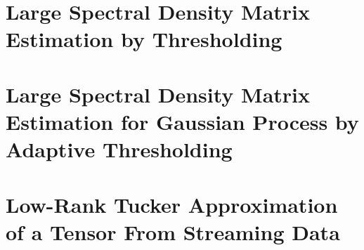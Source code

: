 \documentclass[phd,tocprelim]{cornell}
\numberwithin{equation}{section}
\begin{document}
\chapter{Large Spectral Density Matrix Estimation by Thresholding}








\clearpage
\begin{subappendices}




\end{subappendices}


\chapter{Large Spectral Density Matrix Estimation for Gaussian Process by Adaptive Thresholding}




\clearpage 
\begin{subappendices}





\end{subappendices}
\clearpage 
\chapter{Low-Rank Tucker Approximation of a Tensor From Streaming Data}





\clearpage
\begin{subappendices}







%


\end{subappendices}
\clearpage 
\end{document}
